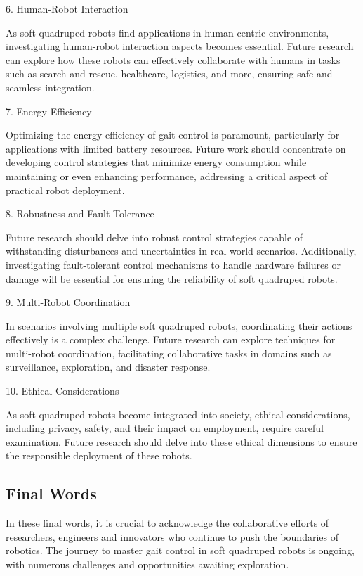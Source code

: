 6. Human-Robot Interaction

As soft quadruped robots find applications in human-centric environments, investigating human-robot interaction aspects becomes essential. Future research can explore how these robots can effectively collaborate with humans in tasks such as search and rescue, healthcare, logistics, and more, ensuring safe and seamless integration.

7. Energy Efficiency

Optimizing the energy efficiency of gait control is paramount, particularly for applications with limited battery resources. Future work should concentrate on developing control strategies that minimize energy consumption while maintaining or even enhancing performance, addressing a critical aspect of practical robot deployment.

8. Robustness and Fault Tolerance

Future research should delve into robust control strategies capable of withstanding disturbances and uncertainties in real-world scenarios. Additionally, investigating fault-tolerant control mechanisms to handle hardware failures or damage will be essential for ensuring the reliability of soft quadruped robots.

9. Multi-Robot Coordination

In scenarios involving multiple soft quadruped robots, coordinating their actions effectively is a complex challenge. Future research can explore techniques for multi-robot coordination, facilitating collaborative tasks in domains such as surveillance, exploration, and disaster response.

10. Ethical Considerations

As soft quadruped robots become integrated into society, ethical considerations, including privacy, safety, and their impact on employment, require careful examination. Future research should delve into these ethical dimensions to ensure the responsible deployment of these robots.

\subsection{Final Words}
In these final words, it is crucial to acknowledge the collaborative efforts of researchers, engineers and innovators who continue to push the boundaries of robotics. The journey to master gait control in soft quadruped robots is ongoing, with numerous challenges and opportunities awaiting exploration.

